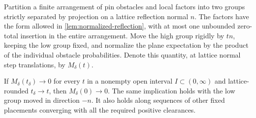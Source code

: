 \begin{lemma}\label{lem:analytic-translation}
Partition a finite arrangement of pin obstacles and local factors
into two groups strictly separated by projection on a lattice
reflection normal $n$.  The factors have the form allowed in
\cref{lem:normalized-reflection}, with at most one unbounded
zero-total insertion in the entire arrangement.  Move the high
group rigidly by $tn$, keeping the low group fixed, and normalize
the plane expectation by the product of the individual obstacle
probabilities.  Denote this quantity, at lattice normal step
translations, by $M_\delta(t)$.

If $M_\delta(t_\delta)\to0$ for every $t$ in a nonempty open
interval $I\subset(0,\infty)$ and lattice-rounded $t_\delta\to t$,
then $M_\delta(0)\to0$.  The same implication holds with the low
group moved in direction $-n$.  It also holds along sequences of
other fixed placements converging with all the required positive
clearances.
\end{lemma}

